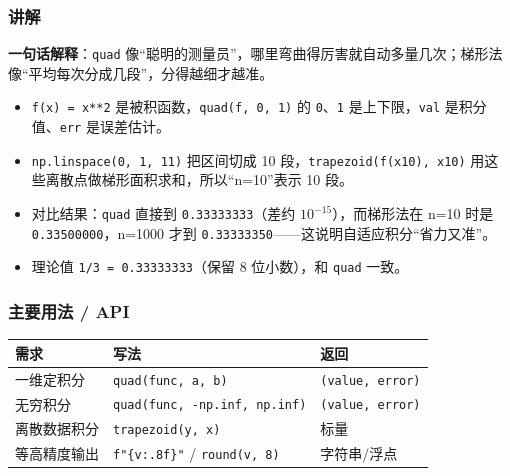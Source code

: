 \begin{Shaded}
\begin{Highlighting}[]
\end{Highlighting}
\end{Shaded}

\subsubsection{讲解}\label{ux8bb2ux89e3-14}

\textbf{一句话解释}：\texttt{quad}
像``聪明的测量员''，哪里弯曲得厉害就自动多量几次；梯形法像``平均每次分成几段''，分得越细才越准。

\begin{itemize}
\tightlist
\item
  \texttt{f(x)\ =\ x**2} 是被积函数，\texttt{quad(f,\ 0,\ 1)} 的
  \texttt{0}、\texttt{1} 是上下限，\texttt{val} 是积分值、\texttt{err}
  是误差估计。
\item
  \texttt{np.linspace(0,\ 1,\ 11)} 把区间切成 10
  段，\texttt{trapezoid(f(x10),\ x10)}
  用这些离散点做梯形面积求和，所以``n=10''表示 10 段。
\item
  对比结果：\texttt{quad} 直接到 \texttt{0.33333333}（差约
  \(10^{-15}\)），而梯形法在 n=10 时是 \texttt{0.33500000}，n=1000 才到
  \texttt{0.33333350}------这说明自适应积分``省力又准''。
\item
  理论值 \texttt{1/3\ =\ 0.33333333}（保留 8 位小数），和 \texttt{quad}
  一致。
\end{itemize}

\subsubsection{主要用法 / API}\label{ux4e3bux8981ux7528ux6cd5-api-14}

{\def\LTcaptype{none} %
\begin{longtable}[]{@{}lll@{}}
\toprule\noalign{}
需求 & 写法 & 返回 \\
\midrule\noalign{}
\endhead
\bottomrule\noalign{}
\endlastfoot
一维定积分 & \texttt{quad(func,\ a,\ b)} & \texttt{(value,\ error)} \\
无穷积分 & \texttt{quad(func,\ -np.inf,\ np.inf)} &
\texttt{(value,\ error)} \\
离散数据积分 & \texttt{trapezoid(y,\ x)} & 标量 \\
等高精度输出 & \texttt{f"\{v:.8f\}"} / \texttt{round(v,\ 8)} &
字符串/浮点 \\
\end{longtable}
}

